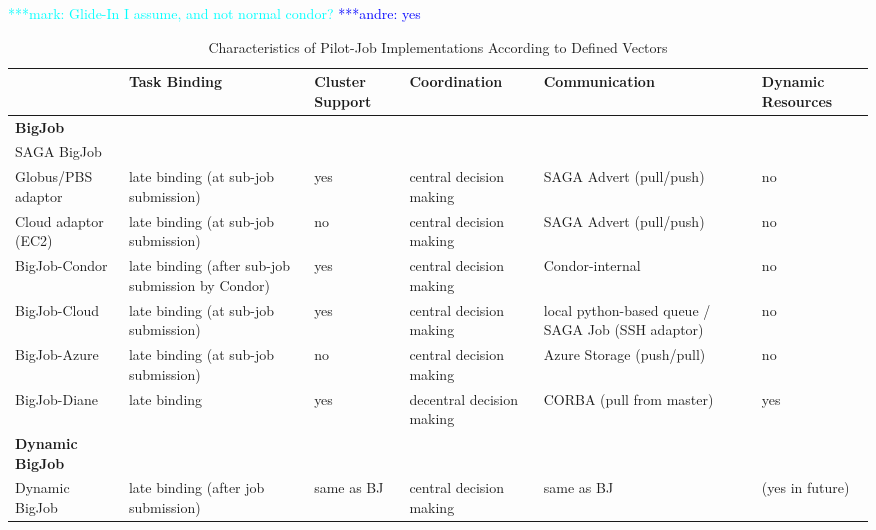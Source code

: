 \documentclass[]{article}
\newcommand{\alnote}[1]{ {\textcolor{blue} { ***andre: #1 }}}
\newcommand{\msnote}[1]{ {\textcolor{cyan} { ***mark: #1 }}}
\newcommand{\alnote}[1]{}
\begin{document}
\msnote{Glide-In I assume, and not normal condor?}\alnote{yes}

\begin{table}[t]
\begin{tabular}{|l|p{2.5cm}|p{2cm}|p{2cm}|p{2cm}|p{2cm}|}
	\hline
	&\textbf{Task Binding} &\textbf{Cluster Support} &\textbf{Coordina\-tion} & \textbf{Communica\-tion} &\textbf{Dynamic Resources}\\
	\hline
	\textbf{BigJob} & &&&&\\
	\hline
	SAGA BigJob & &&&&\\
	\hline
	\hspace{4mm} Globus/PBS adaptor  &late binding (at sub-job submission)  
									 &yes &central decision making &SAGA Advert (pull/push) &no\\  
	\hline
	\hspace{4mm} Cloud adaptor (EC2) &late binding (at sub-job submission)  
									 &no &central decision making &SAGA Advert (pull/push) &no\\ 
    \hline
   BigJob-Condor &late binding (after sub-job submission by Condor) &yes &central decision making &Condor-internal &no\\
	\hline
 	BigJob-Cloud &late binding (at sub-job submission) &yes &central decision making 
				 &local python-based queue / SAGA Job (SSH adaptor) &no\\ 
	\hline
	BigJob-Azure &late binding (at sub-job submission)
	             &no &central decision making &Azure Storage (push/pull) &no\\ 
	\hline
    BigJob-Diane &late binding  &yes &decentral decision making &CORBA (pull from master) &yes\\ 
	\hline	
	\textbf{Dynamic BigJob} & &&&&\\
	\hline
    Dynamic BigJob &late binding (after job submission) &same as BJ &central decision making &same as BJ &(yes in future)\\
    \hline
\end{tabular}
\caption{Characteristics of Pilot-Job Implementations According 
		to Defined Vectors} \label{tab:pilotjob_overview}
\end{table}		
\end{document}
